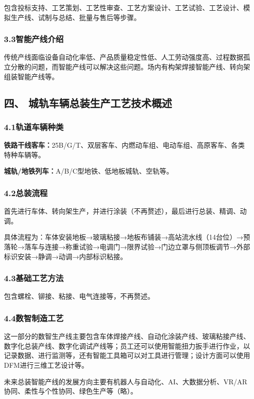 \documentclass[12pt, oneside, a4paper]{ctexart}
\begin{document}
包含投标支持、工艺策划、工艺性审查、工艺方案设计、工艺试验、工艺设计、模拟生产线、试制与总结、批量与售后等步骤。\par{}
\vspace{-5mm}\subsubsection*{3.3\quad{}智能产线介绍}\vspace{-2mm}
传统产线面临设备自动化率低、产品质量稳定性低、人工劳动强度高、过程数据孤立分散的问题，而智能产线可以解决这些问题。场内有构架焊接智能产线、转向架组装智能产线等。

\newpage
\journalpage
\vspace{-7.5mm}\subsection*{四、 城轨车辆总装生产工艺技术概述}
\vspace{-2mm}\subsubsection*{4.1\quad{}轨道车辆种类}\vspace{-2mm}
{\bf{}铁路干线客车：}25B/G/T、双层客车、内燃动车组、电动车组、高原客车、各类特种车辆等。\par{}
{\bf{}城轨/地铁列车：}A/B/C型地铁、低地板城轨、空轨等。\par{}
\vspace{-5mm}\subsubsection*{4.2\quad{}总装流程}\vspace{-2mm}
首先进行车体、转向架生产，并进行涂装（不再赘述），最后进行总装、精调、动调。\par{}
具体流程为：车体安装地板→玻璃粘接→地板布铺装→高站流水线（14台位）→预落轮→落车与连接→称重试验→电调门→限界试验→门边立罩与侧顶板调节→外部标识安装→静调→动调→内部标识粘接。\par{}
\vspace{-5mm}\subsubsection*{4.3\quad{}基础工艺方法}\vspace{-2mm}
包含螺栓、铆接、粘接、电气连接等，不再赘述。\par{}
\vspace{-5mm}\subsubsection*{4.4\quad{}数智制造工艺}\vspace{-2mm}
这一部分的数智生产线主要包含车体焊接产线、自动化涂装产线、玻璃粘接产线、数字化总装产线、数字化调试产线等；员工还可以使用智能扭力扳手进行作业，以记录数据、进行监测等，还有智能工具箱可以对工具进行管理；设计方面可以使用DFM进行三维工艺设计等。\par{}
未来总装智能产线的发展方向主要有机器人与自动化、AI、大数据分析、VR/AR协同、柔性与个性协同、绿色生产等（略）。\par{}
\end{document}
